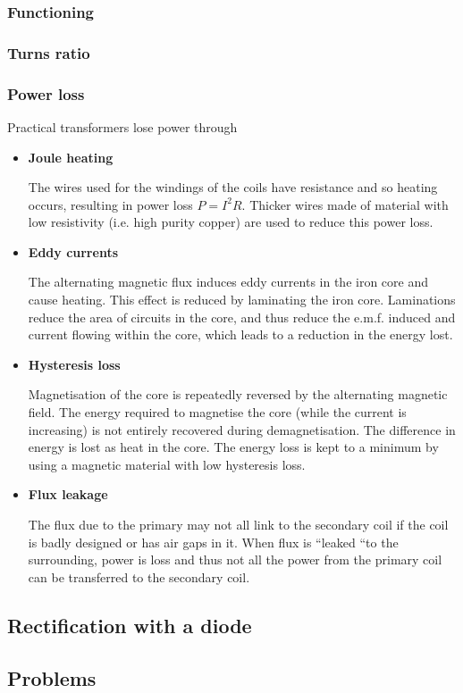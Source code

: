 \subsubsection{Functioning}

\subsubsection{Turns ratio}

\subsubsection{Power loss}
Practical transformers lose power through
\begin{itemize}
\item \textbf{Joule heating}

The wires used for the windings of the coils have resistance and so heating occurs, resulting in power loss $P=I^2R$. Thicker wires made of material with low resistivity (i.e. high purity copper) are used to reduce this power loss.

\item \textbf{Eddy currents}

The alternating magnetic flux induces eddy currents in the iron core and cause heating. This effect is reduced by laminating the iron core. Laminations reduce the area of circuits in the core, and thus reduce the e.m.f. induced and current flowing within the core, which leads to a reduction in the energy lost.

\item \textbf{Hysteresis loss}

Magnetisation of the core is repeatedly reversed by the alternating magnetic field. The energy required to magnetise the core (while the current is increasing) is not entirely recovered during demagnetisation. The difference in energy is lost as heat in the core. The energy loss is kept to a minimum by using a magnetic material with low hysteresis loss.

\item \textbf{Flux leakage}

The flux due to the primary may not all link to the secondary coil if the coil is badly designed or has air gaps in it. When flux is “leaked “to the surrounding, power is loss and thus not all the power from the primary coil can be transferred to the secondary coil.
\end{itemize}


\subsection{Rectification with a diode}

\pagebreak

\subsection*{Problems}

\pagebreak